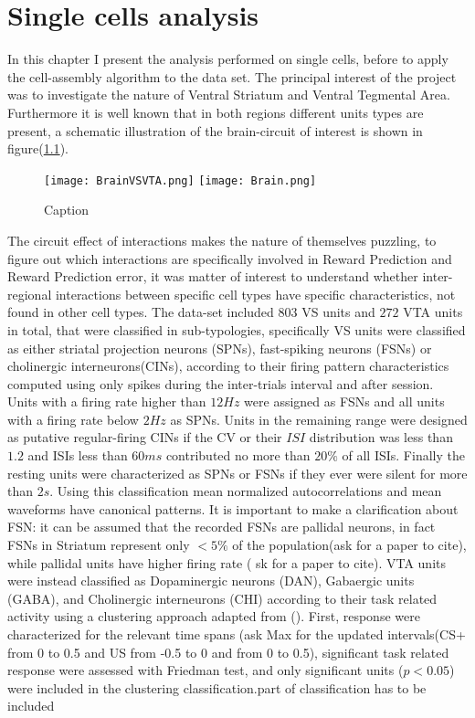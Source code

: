 \chapter{Single cells analysis}
In this chapter I present the analysis performed on single cells, before to apply the cell-assembly algorithm to the data set.
The principal interest of the project was to investigate the nature of Ventral Striatum and Ventral Tegmental Area. Furthermore it is well known that in both regions different units types are present, a schematic illustration of the brain-circuit of interest is shown in figure(\ref{fig:Brain}).
\begin{figure}
    \centering
    \texttt{[image: BrainVSVTA.png]}
    \texttt{[image: Brain.png]}
    \caption{Caption}
    \label{fig:Brain}
\end{figure}
The circuit effect of interactions makes the nature of themselves puzzling, to figure out which interactions are specifically involved in Reward Prediction and Reward Prediction error, it was matter of interest to understand whether inter-regional interactions between specific cell types have specific characteristics, not found in other cell types.
The data-set included $803$ VS units and $272$ VTA units in total, that were classified in sub-typologies, specifically VS units were classified as either striatal projection neurons (SPNs), fast-spiking neurons (FSNs) or cholinergic interneurons(CINs), according to their firing pattern characteristics computed using only spikes during the inter-trials interval and after session. Units with a firing rate higher than $12 Hz$ were assigned as FSNs and all units with a firing rate below $2 Hz$ as SPNs. Units in the remaining range were designed as putative regular-firing CINs if the CV or their $ISI$ distribution was less than $1.2$ and ISIs less than $60 ms$ contributed no more than $20\%$ of all ISIs. Finally the resting units were characterized as SPNs or FSNs if they ever were silent for more than $2 s$. Using this classification mean normalized autocorrelations and mean waveforms have canonical patterns. It is important to make a clarification about FSN: it can be assumed that the recorded FSNs are pallidal neurons, in fact FSNs in Striatum represent only $<5\%$ of the population({\color{red}ask for a paper to cite}), while pallidal units have higher firing rate ({\color{red} sk for a paper to cite}). %
VTA units were instead classified as Dopaminergic neurons (DAN), Gabaergic units (GABA), and Cholinergic interneurons (CHI) according to their task related activity using a clustering approach adapted from (\cite{Uchida}). First, response were characterized for the relevant time spans ({\color{red}ask Max for the updated intervals}(CS+ from 0 to 0.5 and US from -0.5 to 0 and from 0 to 0.5), significant task related response were assessed with Friedman test, and only significant units ($p<0.05$) were included in the clustering classification.{\color{red}part of classification has to be included}

